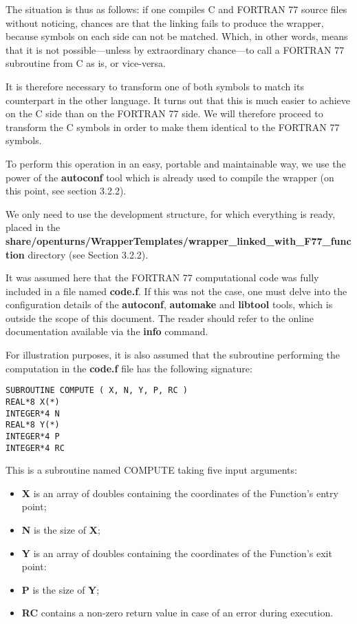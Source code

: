 The situation is thus as follows: if one compiles C and FORTRAN 77 source files without noticing, chances are that the linking fails to produce the wrapper, because symbols on each side can not be matched. Which, in other words, means that it is not possible---unless by extraordinary chance---to call a FORTRAN 77 subroutine from C as is, or vice-versa.

It is therefore necessary to transform one of both symbols to match its counterpart in the other language. It turns out that this is much easier to achieve on the C side than on the FORTRAN 77 side. We will therefore proceed to transform the C symbols in order to make them identical to the FORTRAN 77 symbols.

To perform this operation in an easy, portable and maintainable way, we use the power of the {\bf autoconf} tool which is already used to compile the wrapper (on this point, see section 3.2.2).

We only need to use the development structure, for which everything is ready, placed in the {\bf  share/openturns/WrapperTemplates/wrapper\_linked\_with\_F77\_function} directory (see Section 3.2.2).

It was assumed here that the FORTRAN 77 computational code was fully included in a file named {\bf code.f}. If this was not the case, one must delve into the configuration details of the {\bf autoconf}, {\bf automake} and {\bf libtool} tools, which is outside the scope of this document. The reader should refer to the online documentation available via the {\bf info} command.

For illustration purposes, it is also assumed that the subroutine performing the computation in the {\bf code.f} file has the following signature:

\lstset{language=FORTRAN, basicstyle=\normalsize}
\begin{lstlisting}[frame=TBRL]
SUBROUTINE COMPUTE ( X, N, Y, P, RC )
REAL*8 X(*)
INTEGER*4 N
REAL*8 Y(*)
INTEGER*4 P
INTEGER*4 RC
\end{lstlisting}

This is a subroutine named COMPUTE taking five input arguments:
\begin{itemize}
\item {\bf X} is an array of doubles containing the coordinates of the Function's entry point;
\item {\bf N} is the size of {\bf X};
\item {\bf Y} is an array of doubles containing the coordinates of the Function's exit point:
\item {\bf P} is the size of {\bf Y};
\item {\bf RC} contains a non-zero return value in case of an error during execution.
\end{itemize}

